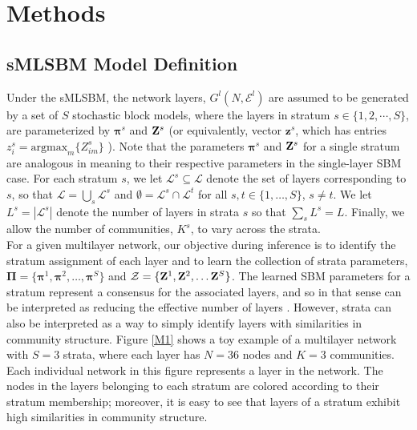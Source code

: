 \section{Methods}
\subsection{sMLSBM Model Definition}
\indent Under the sMLSBM, the network layers, $G^{l}(N,\mathcal{E}^{l})$ are assumed to be generated by a set of $S$ stochastic block models, where the layers in stratum $s \in \{1,2,\cdots,S \}$, are parameterized by ${\boldsymbol \pi}^{s}$ and ${\bf Z}^{s}$ (or equivalently, vector ${\boldsymbol z}^s$, which has entries $z^s_{i}=\text{argmax}_m \{Z_{im}^s\}$ ). Note that the parameters ${\boldsymbol \pi}^{s}$ and ${\bf Z}^{s}$ for a single stratum are analogous in meaning to their respective parameters in the single-layer SBM case. 
For each stratum $s$, we let $\mathcal{L}^s\subseteq\mathcal{L}$ denote the set of layers corresponding to $s$, so that $\mathcal{L}=\bigcup_s \mathcal{L}^s$ and $\emptyset=\mathcal{L}^s\cap \mathcal{L}^t$ for all $s,t\in\{1,\dots,S\}$, $s\neq t$. We let $L^s=|\mathcal{L}^s|$ denote the number of layers in strata $s$ so that $\sum_s L^s=L$.
Finally, we allow the number of communities, $K^{s}$, to vary across the strata.
\\\indent
For a given multilayer network, our objective during inference is to identify the stratum assignment of each layer and to learn the collection of strata parameters, $\boldsymbol{\Pi}=\{\boldsymbol{\pi}^{1},\boldsymbol{\pi}^{2},\dots,\boldsymbol{\pi}^{S}\}$ and $\mathcal{Z}=\{{\bf{Z}}^{1},{\bf{Z}}^{2},\dots {\bf{Z}}^{S}\}$. The learned SBM parameters for a stratum represent a consensus for the associated layers, and so in that sense can be interpreted as reducing the effective number of layers \cite{domen}. However, strata can also be interpreted as a way to simply identify layers with similarities in community structure. Figure \ref{M1} shows a toy example of a multilayer network with $S=3$ strata, where each layer has $N=36$ nodes and $K=3$ communities. Each individual network in this figure represents a layer in the network. The nodes in the layers belonging to each stratum are colored according to their stratum membership; moreover, it is easy to see that layers of a stratum exhibit high similarities in community structure.  \\
